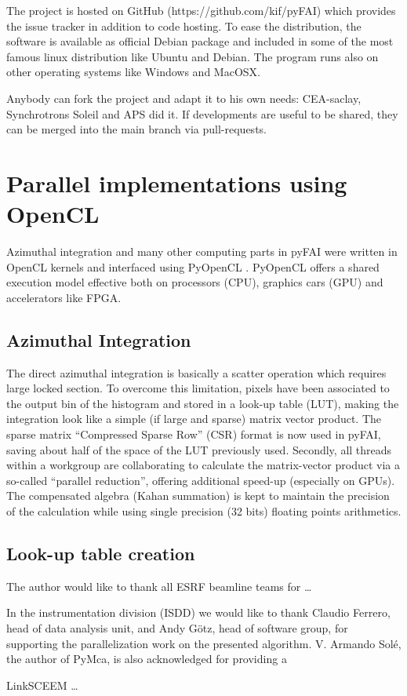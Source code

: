 \documentclass[preprint]{iucr}
\begin{document}
The project is hosted on GitHub (https://github.com/kif/pyFAI) which provides
the issue tracker in addition to code hosting. 
To ease the distribution, the
software is available as official Debian package and included in some of the
most famous linux distribution like Ubuntu and Debian. 
The program runs also on other operating systems like Windows and MacOSX. 

Anybody can fork the project and adapt it to his own needs: CEA-saclay,
Synchrotrons Soleil and APS did it. If developments are useful to be shared,
they can be merged into the main branch via pull-requests.

\section{Parallel implementations using OpenCL}
Azimuthal integration and many other computing parts in pyFAI were written in
OpenCL kernels and interfaced using PyOpenCL \cite{pyopencl}. PyOpenCL offers a
shared execution model effective both on processors (CPU), graphics cars (GPU)
and accelerators like FPGA.

\subsection{Azimuthal Integration}
The direct azimuthal integration is basically a scatter operation which 
requires large locked section. 
To overcome this limitation, pixels have been
associated to the output bin of the histogram and stored in a look-up
table (LUT), making the integration look like a simple (if large and sparse)
matrix vector product.
The sparse matrix ``Compressed Sparse Row'' (CSR) format is now used in pyFAI,
saving about half of the space of the LUT previously used.
Secondly, all threads within a workgroup are collaborating to calculate the
matrix-vector product via a so-called ``parallel reduction'', offering
additional speed-up (especially on GPUs).
The compensated algebra (Kahan summation) is kept to maintain the precision 
of the calculation while using single precision (32 bits) floating points
arithmetics.

\subsection{Look-up table creation}



The author would like to thank all ESRF beamline teams for \ldots 

In the instrumentation division (ISDD) we would like to thank Claudio Ferrero,
head of data analysis unit, and Andy G\"otz, head of software group, for
supporting the parallelization work on the presented algorithm.
V. Armando Solé, the author of PyMca, is also acknowledged for providing a

LinkSCEEM \ldots
\end{document}
